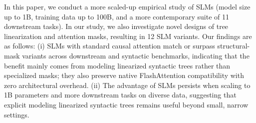 \documentclass[11pt]{article}
\begin{document}
In this paper, we conduct a more scaled-up empirical study of SLMs (model size up to 1B, training data up to 100B, and a more contemporary suite of 11 downstream tasks). In our study, we also investigate novel designs of tree linearization and attention masks, resulting in 12 SLM variants.
%
Our findings are as follows: (i) SLMs with standard causal attention match or surpass structural-mask variants across downstream and syntactic benchmarks, indicating that the benefit mainly comes from modeling linearized syntactic trees rather than specialized masks; they also preserve native FlashAttention compatibility with zero architectural overhead. (ii) The advantage of SLMs persists when scaling to 1B parameters and more downstream tasks on diverse data, suggesting that explicit modeling linearized syntactic trees remains useful beyond small, narrow settings.
\end{document}
